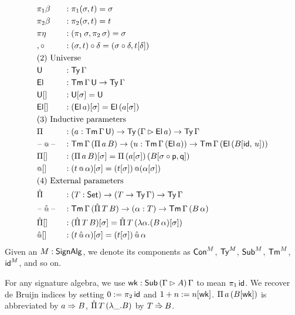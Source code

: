 \documentclass[a4paper,UKenglish,cleveref, autoref]{lipics-v2019}
\begin{document}
\begin{definition}
\begin{alignat*}{5}
  & {\pi_1\beta} && : \pi_1(\sigma, t) = \sigma \\
  & {\pi_2\beta} && : \pi_2(\sigma, t) = t \\
  & {\pi\eta} && : (\pi_1\,\sigma, \pi_2\,\sigma) = \sigma \\
  & {,\circ} && : (\sigma, t)\circ\delta = (\sigma\circ\delta, t[\delta]) \\
  & \rlap{(2) Universe} \\
  & \U && : \Ty\,\Gamma \\
  & \El && : \Tm\,\Gamma\,\U\ra\Ty\,\Gamma \\
  & {\U[]} && : \U[\sigma] = \U \\
  & {\El[]} && : (\El\,a)[\sigma] = \El\,(a[\sigma]) \\
  & \rlap{(3) Inductive parameters} \\
  & \Pi && : (a:\Tm\,\Gamma\,\U)\ra\Ty\,(\Gamma\ext\El\,a)\ra\Ty\,\Gamma \\
  & \blank\oldapp\blank && : \Tm\,\Gamma\,(\Pi\,a\,B)\ra (u : \Tm\,\Gamma\,(\El\,a))
  \ra \Tm\,\Gamma\,(\El\,(B[\id,\,u])) \\
  & {\Pi[]} && : (\Pi\,a\,B)[\sigma] = \Pi\,(a[\sigma])\,(B[\sigma\circ\p,\q]) \\
  & {\oldapp[]} && : (t\oldapp\alpha)[\sigma] = (t[\sigma])\mathop{\oldapp}(\alpha[\sigma]) \\
  & \rlap{(4) External parameters} \\
  & \Pim && : (T:\Set)\ra(T\ra\Ty\,\Gamma)\ra\Ty\,\Gamma \\
  & \blank\appm \blank && : \Tm\,\Gamma\,(\Pim\,T\,B)\ra(\alpha:T) \ra\Tm\,\Gamma\,(B\,\alpha) \\
  & {\Pim[]} && : (\Pim\,T\,B)[\sigma] = \Pim\,T\,(\lambda \alpha.(B\,\alpha)[\sigma]) \\
  & {\appm[]} && : (t\appm\alpha)[\sigma] = (t[\sigma])\mathop{\appm}\alpha
\end{alignat*}
Given an $M:\mathsf{SignAlg}$, we denote its components as $\mathsf{Con}^M$, $\mathsf{Ty}^M$,
$\mathsf{Sub}^M$, $\mathsf{Tm}^M$, $\mathsf{id}^M$, and so on.
\end{definition}

\begin{definition}[Abbreviations]\label{def:abbrevs}
  For any signature algebra, we use
  $\mathsf{wk} : \mathsf{Sub}\,(\Gamma\rhd A)\,\Gamma$ to mean $\pi_1\,\mathsf{id}$. We
  recover de Bruijn indices by setting $0:= \pi_2 \,\mathsf{id}$ and
  $1+n := n[\mathsf{wk}]$. $\Pi\,a\,(B[\mathsf{wk}])$ is abbreviated by $a\Rightarrow B$,
  $\hat{\Pi}\,T\,(\lambda\_.B)$ by $T\mathbin{\hat{\Rightarrow}} B$.
\end{definition}
\end{document}

